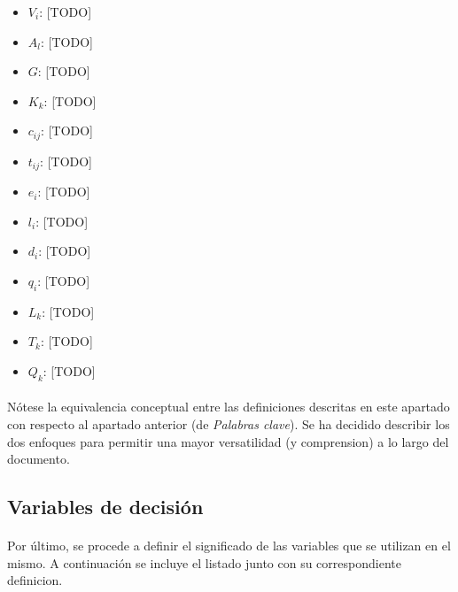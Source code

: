 \documentclass{subfiles}
\begin{document}
        \begin{itemize}

          \item $V_{i}$: [TODO]

          \item $A_{l}$: [TODO]

          \item $G$: [TODO]

          \item $K_{k}$: [TODO]

          \item $c_{ij}$: [TODO]

          \item $t_{ij}$: [TODO]

          \item $e_{i}$: [TODO]

          \item $l_{i}$: [TODO]

          \item $d_{i}$: [TODO]

          \item $q_{i}$: [TODO]

          \item $L_{k}$: [TODO]

          \item $T_{k}$: [TODO]

          \item $Q_{k}$: [TODO]
        \end{itemize}

        \paragraph{}
        Nótese la equivalencia conceptual entre las definiciones descritas en este apartado con respecto al apartado anterior (de \emph{Palabras clave}). Se ha decidido describir los dos enfoques para permitir una mayor versatilidad (y comprension) a lo largo del documento.

      \subsection{Variables de decisión}
      \label{sec:formulation_variables}

        \paragraph{}
        Por último, se procede a definir el significado de las variables que se utilizan en el mismo. A continuación se incluye el listado junto con su correspondiente definicion.
\end{document}
